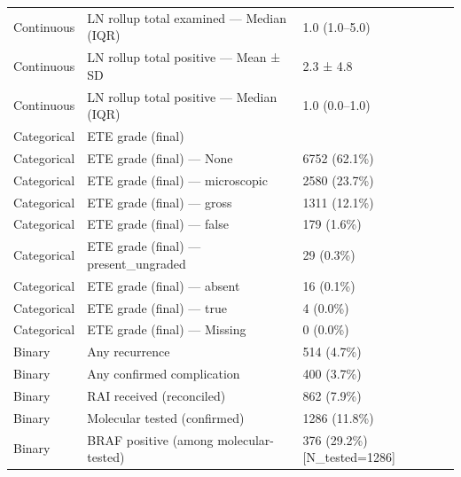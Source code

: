 \begin{table}[htbp]
\begin{tabular}{lll}
Continuous & LN rollup total examined — Median (IQR) & 1.0 (1.0–5.0) \\
Continuous & LN rollup total positive — Mean ± SD & 2.3 ± 4.8 \\
Continuous & LN rollup total positive — Median (IQR) & 1.0 (0.0–1.0) \\
Categorical & ETE grade (final) &  \\
Categorical & ETE grade (final) — None & 6752 (62.1\%) \\
Categorical & ETE grade (final) — microscopic & 2580 (23.7\%) \\
Categorical & ETE grade (final) — gross & 1311 (12.1\%) \\
Categorical & ETE grade (final) — false & 179 (1.6\%) \\
Categorical & ETE grade (final) — present\_ungraded & 29 (0.3\%) \\
Categorical & ETE grade (final) — absent & 16 (0.1\%) \\
Categorical & ETE grade (final) — true & 4 (0.0\%) \\
Categorical & ETE grade (final) — Missing & 0 (0.0\%) \\
Binary & Any recurrence & 514 (4.7\%) \\
Binary & Any confirmed complication & 400 (3.7\%) \\
Binary & RAI received (reconciled) & 862 (7.9\%) \\
Binary & Molecular tested (confirmed) & 1286 (11.8\%) \\
Binary & BRAF positive (among molecular-tested) & 376 (29.2\%) [N\_tested=1286] \\
\bottomrule
\end{tabular}
\end{table}
